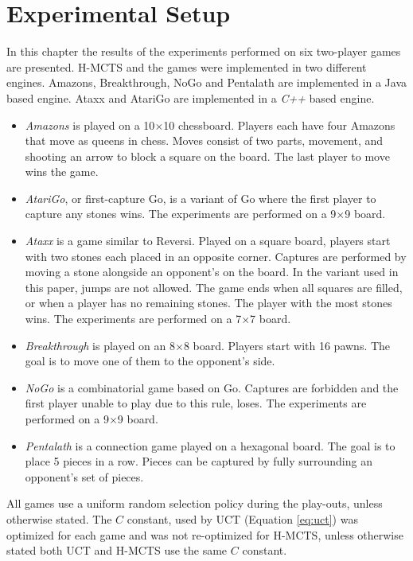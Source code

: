 \documentclass{kecsmstr}
\begin{document}
\section{Experimental Setup}
\label{sec:ex_setup}
In this chapter the results of the experiments performed on six two-player games are presented. H-MCTS and the games were implemented in two different engines. Amazons, Breakthrough, NoGo and Pentalath are implemented in a Java based engine. Ataxx and AtariGo are implemented in a \emph{C++} based engine.
\begin{itemize}
\item \emph{Amazons} is played on a 10$\times$10 chessboard. Players each have four Amazons that move as queens in chess. Moves consist of two parts, movement, and shooting an arrow to block a square on the board. The last player to move wins the game.
\item \emph{AtariGo}, or first-capture Go, is a variant of Go where the first player to capture any stones wins. The experiments are performed on a 9$\times$9 board.
\item \emph{Ataxx} is a game similar to Reversi. Played on a square board, players start with two stones each placed in an opposite corner. Captures are performed by moving a stone alongside an opponent's on the board. In the variant used in this paper, jumps are not allowed. The game ends when all squares are filled, or when a player has no remaining stones. The player with the most stones wins.  The experiments are performed on a 7$\times$7 board.
\item \emph{Breakthrough} is played on an 8$\times$8 board. Players start with 16 pawns. The goal is to move one of them to the opponent's side.
\item \emph{NoGo} is a combinatorial game based on Go. Captures are forbidden and the first player unable to play due to this rule, loses. The experiments are performed on a 9$\times$9 board.
\item \emph{Pentalath} is a connection game played on a hexagonal board. The goal is to place 5 pieces in a row. Pieces can be captured by fully surrounding an opponent's set of pieces.
\end{itemize}

All games use a uniform random selection policy during the play-outs, unless otherwise stated. The $C$ constant, used by UCT (Equation \ref{eq:uct}) was optimized for each game and was not re-optimized for H-MCTS, unless otherwise stated both UCT and H-MCTS use the same $C$ constant.
\end{document}
